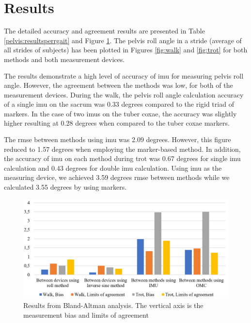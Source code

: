 \section{Results}
\label{sec:analysis}

The detailed accuracy and agreement results are presented in Table \ref{pelvis:resultsperrgait} and Figure \ref{blandaltman}. The pelvis roll angle in a stride (average of all strides of subjects) has been plotted in Figures \ref{fig:walk} and \ref{fig:trot} for both methods and both measurement devices. 

The results demonstrate a high level of accuracy of \gls{imu} for measuring pelvis roll angle. However, the agreement between the methods was low, for both of the measurement devices. During the walk, the pelvis roll angle calculation accuracy of a single \gls{imu} on the sacrum was 0.33 degrees compared to the rigid triad of markers. In the case of two \gls{imu}s on the tuber coxae, the accuracy was slightly higher resulting at 0.28 degrees when compared to the tuber coxae markers. 

The \gls{rmse} between methods using \gls{imu} was 2.09 degrees. However, this figure reduced to 1.57 degrees when employing the marker-based method. In addition, the accuracy of \gls{imu} on each method during trot was 0.67 degrees for single \gls{imu} calculation and 0.43 degrees for double \gls{imu} calculation. Using \gls{imu} as the measuring device, we achieved 3.59 degrees \gls{rmse} between methods while we calculated 3.55 degrees by using markers.




\begin{figure}[htbp]
\centering
\includegraphics[width=\linewidth]{chapters/Pelvis/figures/Picture1.png}
\caption{Results from Bland-Altman analysis. The vertical axis is the measurement bias and limits of agreement}
\label{blandaltman}
\end{figure}

